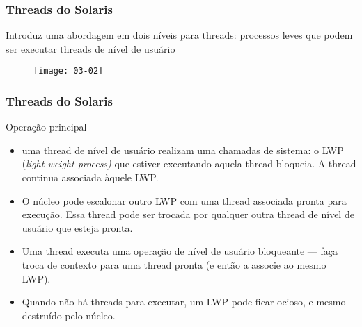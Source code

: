 \documentclass[Ligatures=TeX,table,brazil,svgnames,usetotalslideindicator,compress,10pt]{beamer}
\begin{document}
\begin{frame}
  \frametitle{Threads do Solaris} Introduz uma abordagem em dois
  níveis para threads: \alert{processos leves} que podem ser executar
  threads de nível de usuário

  \begin{figure}
    \centering
    \texttt{[image: 03-02]}
  \end{figure}
\end{frame}

\begin{frame}
  \frametitle{Threads do Solaris}
  \begin{block}{Operação principal}
    \begin{itemize}
    \item uma thread de nível de usuário realizam uma chamadas de sistema: o LWP (\textit{light-weight process)} que estiver executando aquela thread bloqueia. A thread continua associada àquele LWP.
    \item O núcleo pode escalonar outro LWP com uma thread associada pronta para execução. Essa thread pode ser trocada por qualquer outra thread de nível de usuário que esteja pronta.
    \item Uma thread executa uma operação de nível de usuário bloqueante --- faça troca de contexto para uma thread pronta (e então a associe ao mesmo LWP).
    \item Quando não há threads para executar, um LWP pode ficar ocioso, e mesmo destruído pelo núcleo.
    \end{itemize}
  \end{block}

\end{frame}
\end{document}

